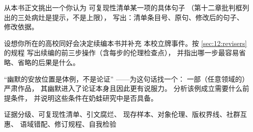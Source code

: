 \begin{nlexercises}
  \item 从本书正文挑出一个你认为
        可复现性清单某一项的具体句子
        （第十二章批判框列出的三处病灶是提示，不是上限），
        写出：清单条目号、原句、修改后的句子、
        修改依据。
  \item 设想你所在的高校同好会决定续编本书并补充
        本校立牌事件。按 \ref{sec:12:revisers} 的规程
        写出续编的前三步操作（含每步的伦理检查点），
        并指出哪一步最容易省略、省略的后果是什么。
  \item “幽默的安放位置是体例，不是论证”
        ——为这句话找一个：
        一部（任意领域的）严肃作品，
        其幽默进入了论证本身且因此更有说服力。
        分析该例成立需要什么前提条件，
        并说明这些条件在奶蛙研究中是否具备。
\end{nlexercises}

\nlkeywords 证据分级、可复现性清单、引文腐烂、
现存样本、对象伦理、版权界线、社群互惠、
语域错配、修订规程、自我检验
